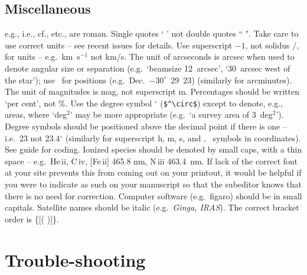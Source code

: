 \subsection{Miscellaneous}

e.g., i.e., cf., etc., are roman.
Single quotes `  ' not double quotes `` ".
Take care to use correct units -- see recent \hbox{issues} for  details. 
Use  superscript $-1$, not solidus /, for units -- e.g.\ km~s$^{-1}$ not 
km/s. The unit of arcseconds is arcsec when used to denote  angular  
size  or separation (e.g.\ `beamsize 12~arcsec',  `30~arcsec 
west  of  the star'); use \arcsec\ for positions (e.g.\  
Dec.~$-30^\circ$~29\arcmin~23\arcsec) (similarly for arcminutes). 
The unit of magnitudes is  mag, 
not superscript m. Percentages should be written `per cent',  not 
\%.  Use the degree symbol $^\circ$ (\verb"$^\circ$")  except to denote, e.g., areas,  where      
`deg$^2$'  may be more appropriate (e.g.\ `a survey area of 3~deg$^2$'). 
Degree symbols should be positioned above the decimal  point  if 
there  is one -- i.e.\ 23\fdg 4 not 23.4$^\circ$ (similarly for  superscript 
h, m, s, and \arcmin, \arcsec\ symbols in coordinates). See guide for coding.
Ionized  species  should be denoted by small caps,  with  a  thin 
space -- e.g.\ \hbox{He\,{\sc ii}}, \hbox{C\,{\sc iv}}, 
\hbox{[Fe\,{\sc ii}]} 465.8 nm, \hbox{N\,{\sc iii}} 463.4~nm.  If 
lack  of the correct font at your site prevents this from  coming 
out on your printout, it would be helpful if you were to indicate 
as such on your manuscript so that the subeditor knows that there 
is no need for correction.
Computer software (e.g.\ {\sc figaro}) should be in small capitals.
Satellite names should be italic (e.g.\ {\it Ginga, IRAS\/}).
The correct bracket order is \{[( )]\}.


\section{Trouble-shooting}

